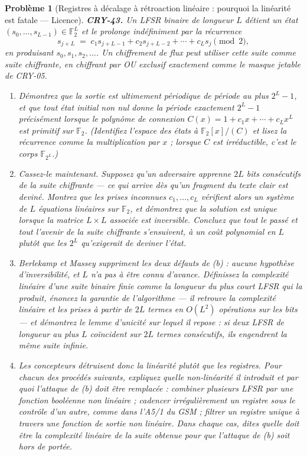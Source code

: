 \documentclass[11pt]{article}
\newtheorem{problem}{Problème}
\begin{document}
\begin{problem}[{Registres à décalage à rétroaction linéaire : pourquoi la linéarité est fatale --- Licence}]
\textbf{CRY-43.} Un LFSR binaire de longueur $L$ détient un état
$(s_0, \dots, s_{L-1}) \in \mathbb{F}_2^L$ et le prolonge indéfiniment par la récurrence
\[ s_{j+L} \;=\; c_1 s_{j+L-1} + c_2 s_{j+L-2} + \cdots + c_L s_j \pmod 2 , \]
en produisant $s_0, s_1, s_2, \dots$. Un chiffrement de flux peut utiliser cette suite comme
suite chiffrante, en chiffrant par OU exclusif exactement comme le masque jetable de
CRY-05.
\begin{enumerate}
\item[(a)] Démontrez que la sortie est ultimement périodique de période au plus $2^L - 1$, et que
tout état initial non nul donne la période exactement $2^L - 1$ précisément lorsque le
polynôme de connexion $C(x) = 1 + c_1 x + \cdots + c_L x^L$ est primitif sur
$\mathbb{F}_2$. (Identifiez l'espace des états à $\mathbb{F}_2[x]/(C)$ et lisez la
récurrence comme la multiplication par $x$ ; lorsque $C$ est irréductible, c'est le corps
$\mathbb{F}_{2^L}$.)
\item[(b)] Cassez-le maintenant. Supposez qu'un adversaire apprenne $2L$ bits consécutifs de la
suite chiffrante --- ce qui arrive dès qu'un fragment du texte clair est deviné. Montrez que
les prises inconnues $c_1, \dots, c_L$ vérifient alors un système de $L$ équations
linéaires sur $\mathbb{F}_2$, et démontrez que la solution est unique lorsque la matrice
$L \times L$ associée est inversible. Concluez que tout le passé et tout l'avenir de la
suite chiffrante s'ensuivent, à un coût polynomial en $L$ plutôt que les $2^L$
qu'exigerait de deviner l'état.
\item[(c)] Berlekamp et Massey suppriment les deux défauts de (b) : aucune hypothèse
d'inversibilité, et $L$ n'a pas à être connu d'avance. Définissez la \textit{complexité
linéaire} d'une suite binaire finie comme la longueur du plus court LFSR qui la produit,
énoncez la garantie de l'algorithme --- il retrouve la complexité linéaire et les prises à
partir de $2L$ termes en $O(L^2)$ opérations sur les bits --- et démontrez le lemme
d'unicité sur lequel il repose : si deux LFSR de longueur au plus $L$ coïncident sur $2L$
termes consécutifs, ils engendrent la même suite infinie.
\item[(d)] Les concepteurs détruisent donc la linéarité plutôt que les registres. Pour chacun des
procédés suivants, expliquez quelle non-linéarité il introduit et par quoi l'attaque de (b)
doit être remplacée : combiner plusieurs LFSR par une fonction booléenne non linéaire ;
cadencer irrégulièrement un registre sous le contrôle d'un autre, comme dans l'A5/1 du GSM ;
filtrer un registre unique à travers une fonction de sortie non linéaire. Dans chaque cas,
dites quelle doit être la complexité linéaire de la suite obtenue pour que l'attaque de (b)
soit hors de portée.
\end{enumerate}

\end{problem}
\end{document}
